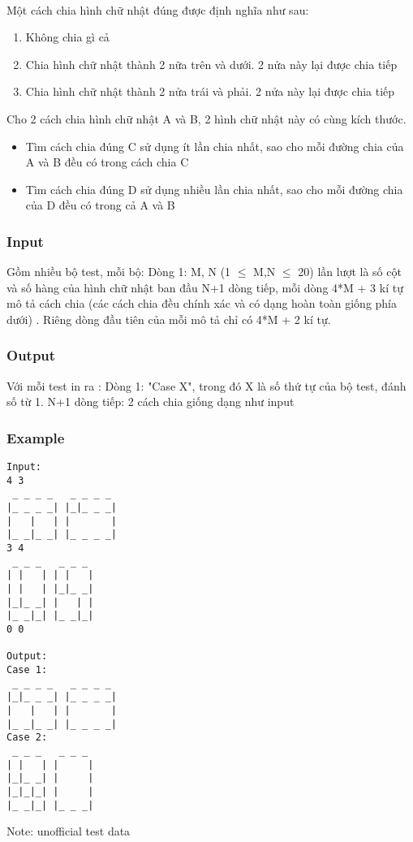 

 

Một cách chia hình chữ nhật đúng được định nghĩa như sau:
\begin{enumerate}
	\item Không chia gì cả
	\item Chia hình chữ nhật thành 2 nữa trên và dưới. 2 nửa này lại được chia tiếp
	\item Chia hình chữ nhật thành 2 nửa trái và phải. 2 nửa này lại được chia tiếp
\end{enumerate}

Cho 2 cách chia hình chữ nhật A và B, 2 hình chữ nhật này có cùng kích thước.
\begin{itemize}
	\item Tìm cách chia đúng C sử dụng ít lần chia nhất, sao cho mỗi đường chia của A và B đều có trong cách chia C
	\item Tìm cách chia đúng D sử dụng nhiều lần chia nhất, sao cho mỗi đường chia của D đều có trong cả A và B
\end{itemize}

\subsubsection{Input}

Gồm nhiều bộ test, mỗi bộ: Dòng 1: M, N (1 $\le$ M,N $\le$ 20) lần lượt là số cột và số hàng của hình chữ nhật ban đầu N+1 dòng tiếp, mỗi dòng 4*M + 3 kí tự mô tả cách chia (các cách chia đều chính xác và có dạng hoàn toàn giống phía dưới) . Riêng dòng đầu tiên của mỗi mô tả chỉ có 4*M + 2 kí tự.

\subsubsection{Output}

Với mỗi test in ra : Dòng 1: "Case X", trong đó X là số thứ tự của bộ test, đánh số từ 1. N+1 dòng tiếp: 2 cách chia giống dạng như input

\subsubsection{Example}
\begin{verbatim}
Input:
4 3
 _ _ _ _   _ _ _ _ 
|_ _ _ _| |_|_ _ _|
|   |   | |       |
|_ _|_ _| |_ _ _ _|
3 4
 _ _ _   _ _ _ 
| |   | | |   |
| |   | |_|_ _|
|_|_ _| |   | |
|_ _|_| |_ _|_|
0 0

Output:
Case 1:
 _ _ _ _   _ _ _ _ 
|_|_ _ _| |_ _ _ _|
|   |   | |       |
|_ _|_ _| |_ _ _ _|
Case 2:
 _ _ _   _ _ _ 
| |   | |     |
|_|_ _| |     |
|_|_|_| |     |
|_ _|_| |_ _ _|

\end{verbatim}

Note: unofficial test data
